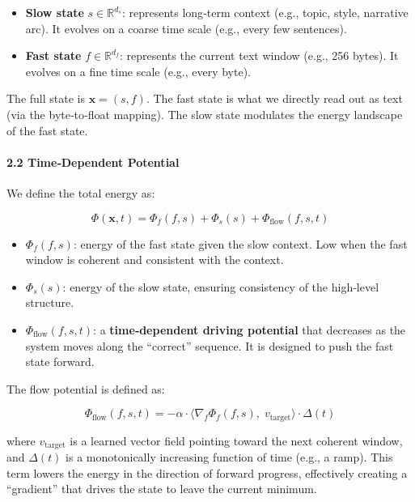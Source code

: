 \documentclass[
  11pt,
  a4paper,
]{article}
\providecommand{\tightlist}{%
  \setlength{\itemsep}{0pt}\setlength{\parskip}{0pt}}
\begin{document}
\begin{itemize}
\tightlist
\item
  \textbf{Slow state} \(s \in \mathbb{R}^{d_s}\): represents long‑term
  context (e.g., topic, style, narrative arc). It evolves on a coarse
  time scale (e.g., every few sentences).
\item
  \textbf{Fast state} \(f \in \mathbb{R}^{d_f}\): represents the current
  text window (e.g., 256 bytes). It evolves on a fine time scale (e.g.,
  every byte).
\end{itemize}

The full state is \(\mathbf{x} = (s, f)\). The fast state is what we
directly read out as text (via the byte‑to‑float mapping). The slow
state modulates the energy landscape of the fast state.

\paragraph{2.2 Time‑Dependent Potential}\label{timedependent-potential}

We define the total energy as:

\[
\Phi(\mathbf{x}, t) = \Phi_f(f, s) + \Phi_s(s) + \Phi_{\text{flow}}(f, s, t)
\]

\begin{itemize}
\tightlist
\item
  \(\Phi_f(f, s)\): energy of the fast state given the slow context. Low
  when the fast window is coherent and consistent with the context.
\item
  \(\Phi_s(s)\): energy of the slow state, ensuring consistency of the
  high‑level structure.
\item
  \(\Phi_{\text{flow}}(f, s, t)\): a \textbf{time‑dependent driving
  potential} that decreases as the system moves along the ``correct''
  sequence. It is designed to push the fast state forward.
\end{itemize}

The flow potential is defined as:

\[
\Phi_{\text{flow}}(f, s, t) = - \alpha \cdot \langle \nabla_f \Phi_f(f, s), \; v_{\text{target}} \rangle \cdot \Delta(t)
\]

where \(v_{\text{target}}\) is a learned vector field pointing toward
the next coherent window, and \(\Delta(t)\) is a monotonically
increasing function of time (e.g., a ramp). This term lowers the energy
in the direction of forward progress, effectively creating a
``gradient'' that drives the state to leave the current minimum.
\end{document}
